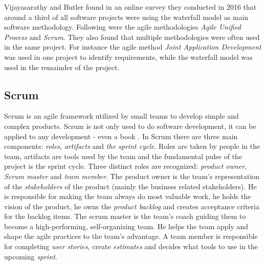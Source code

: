 Vijayasarathy and Butler \cite{vijayasarathy2016choice} found in an online
survey they conducted in 2016 that around a third of all software projects were
using the waterfall model as main software methodology. Following were the
agile methodologies \textit{Agile Unified Process} and \textit{Scrum}. They
also found that multiple methodologies were often used in the same project.
For instance the agile method \textit{Joint Application Development} was used
in one project to identify requirements, while the waterfall model was used in
the remainder of the project.

\subsection{Scrum}

Scrum is an agile framework utilized by small teams to develop simple and
complex products. Scrum is not only used to do software development, it can be
applied to any development - even a book \cite{sims2012scrum}. In Scrum there
are three main components: \textit{roles}, \textit{artifacts} and \textit{the
sprint cycle}. Roles are taken by people in the team, artifacts are tools used
by the team and the fundamental pulse of the project is the sprint cycle. Three
distinct roles are recognized: \textit{product owner}, \textit{Scrum master}
and \textit{team member}. The product owner is the team's representation of the
\textit{stakeholders} of the product (mainly the business related
stakeholders). He is responsible for making the team always do most valuable
work, he holds the vision of the product, he owns the \textit{product backlog}
and creates acceptance criteria for the backlog items. The scrum master is the
team's coach guiding them to become a high-performing, self-organizing team. He
helps the team apply and shape the agile practices to the team's advantage. A
team member is responsible for completing \textit{user stories}, create
\textit{estimates} and decides what tools to use in the upcoming
\textit{sprint}. \cite{sims2012scrum}

